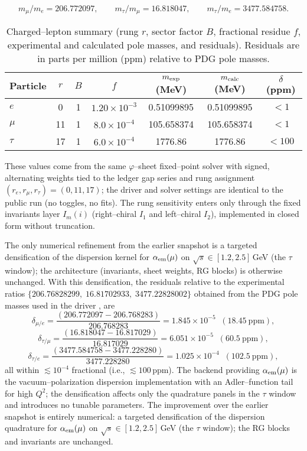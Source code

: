 \documentclass[%
 amsmath,amssymb,
 aps,
prb,
floatfix, showkeys
]{revtex4-2}
\begin{document}
\[
m_\mu/m_e=206.772097,\qquad m_\tau/m_\mu=16.818047,\qquad m_\tau/m_e=3477.584758.
\]


\begin{table}[H]
\caption{Charged--lepton summary (rung $r$, sector factor $B$, fractional residue $f$, experimental and calculated pole masses, and residuals). Residuals are in parts per million (ppm) relative to PDG pole masses.}
\label{tab:leptons}
\begin{tabular}{l c c c c c c}
\hline
Particle & $r$ & $B$ & $f$ & $m_{\rm exp}$ (MeV) & $m_{\rm calc}$ (MeV) & $\delta$ (ppm) \\
\hline
$e$   & 0  & 1 & $1.20\times10^{-3}$ & 0.51099895 & 0.51099895 & $<\!1$ \\
$\mu$ & 11 & 1 & $8.0\times10^{-4}$ & 105.658374 & 105.658374 & $<\!1$ \\
$\tau$& 17 & 1 & $6.0\times10^{-4}$ & 1776.86 & 1776.86 & $<\!100$ \\
\hline
\end{tabular}
\end{table}


These values come from the same $\varphi$--sheet fixed--point solver with signed,
alternating weights tied to the ledger gap series and rung assignment
$(r_e,r_\mu,r_\tau)=(0,11,17)$; the driver and solver settings are identical to
the public run (no toggles, no fits). The rung sensitivity enters only through the fixed invariants layer
$I_m(i)$ (right--chiral $I_1$  and left--chiral $I_2$), implemented in closed form without truncation.

The only numerical refinement from the earlier snapshot is a targeted densification of the dispersion kernel for $\alpha_{\rm em}(\mu)$ on $\sqrt{s}\!\in[1.2,2.5]\,$GeV (the $\tau$ window); the architecture (invariants, sheet weights, RG blocks) is otherwise unchanged. With this densification, the residuals relative to the experimental ratios  $\{206.76828299,\; 16.81702933,\; 3477.22828002\}$ obtained from the PDG pole masses used in the driver \cite{PDG2024},  are
\[
\delta_{\mu/e}=\frac{(206.772097-206.768283)}{206.768283}=1.845\times 10^{-5}\;\;(18.45~\mathrm{ppm}),
\]
\[
\delta_{\tau/\mu}=\frac{(16.818047-16.817029)}{16.817029}=6.051\times 10^{-5}\;\;(60.5~\mathrm{ppm}),
\]
\[
\delta_{\tau/e}=\frac{(3477.584758-3477.228280)}{3477.228280}=1.025\times 10^{-4}\;\;(102.5~\mathrm{ppm}),
\]
 all within $\lesssim 10^{-4}$ fractional (i.e., $\lesssim 100$\,ppm). The backend providing $\alpha_{\rm em}(\mu)$ is the vacuum–polarization dispersion implementation with an Adler–function tail for high $Q^2$; the densification affects only the quadrature panels in the $\tau$ window and introduces no tunable parameters.
 The improvement over the earlier snapshot is entirely numerical: a targeted densification of the dispersion quadrature for $\alpha_{\rm em}(\mu)$ on $\sqrt{s}\!\in[1.2,2.5]\,$GeV (the $\tau$ window); the RG blocks and invariants are unchanged.
\end{document}
